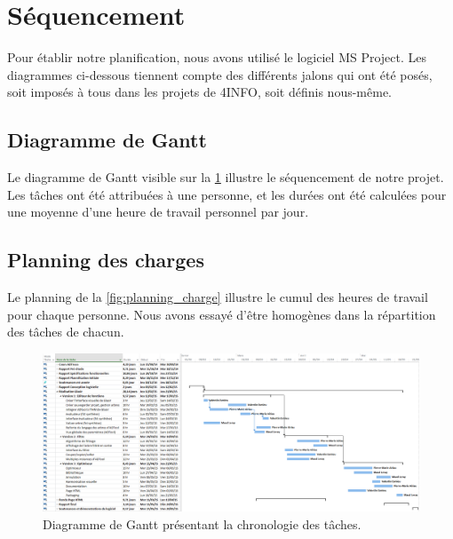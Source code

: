 \section{Séquencement}
	\label{sec:sequencement}
	Pour établir notre planification, nous avons utilisé le logiciel MS Project. Les diagrammes ci-dessous tiennent compte des différents jalons qui ont été posés, soit imposés à tous dans les projets de 4INFO, soit définis nous-même.

	\subsection{Diagramme de Gantt}
		Le diagramme de Gantt visible sur la \ffigure{} \ref{fig:gantt} illustre le séquencement de notre projet. Les tâches ont été attribuées à une personne, et les durées ont été calculées pour une moyenne d'une heure de travail personnel par jour.

	\subsection{Planning des charges}
		Le planning de la \ffigure{} \ref{fig:planning_charge} illustre le cumul des heures de travail pour chaque personne. Nous avons essayé d'être homogènes dans la répartition des tâches de chacun.

		\begin{landscape}
		 	\begin{figure}
	            \centering
	            \includegraphics[height=0.70\textwidth]{figure/DiagGantt.png}
	            \caption{Diagramme de Gantt présentant la chronologie des tâches.}
	            \label{fig:gantt}
	        \end{figure}
	    \end{landscape}

